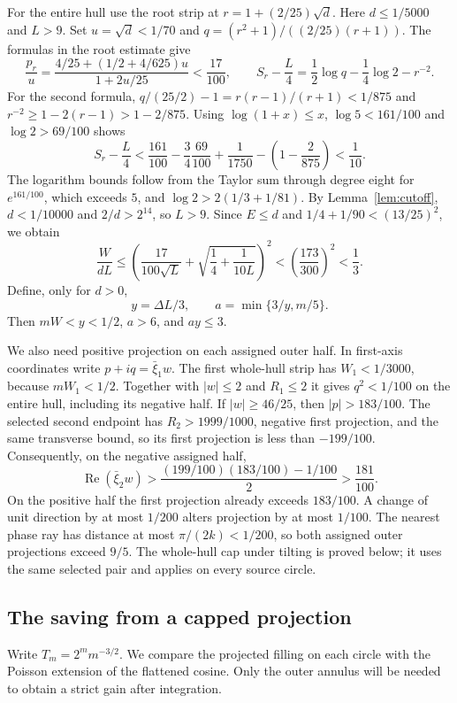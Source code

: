 \documentclass[11pt]{article}
\begin{document}
	For the entire hull use the root strip at $r=1+(2/25)\sqrt d$.
	Here $d\leq1/5000$ and $L>9$. Set $u=\sqrt d<1/70$ and
	$q=(r^2+1)/((2/25)(r+1))$. The formulas in the root estimate give
	\[
	\frac{p_r}{u}
	=\frac{4/25+(1/2+4/625)u}{1+2u/25}<\frac{17}{100},
	\qquad
	S_r-\frac L4=\frac12\log q-\frac14\log2-r^{-2}.
	\]
	For the second formula, $q/(25/2)-1=r(r-1)/(r+1)<1/875$
	and $r^{-2}\geq1-2(r-1)>1-2/875$. Using $\log(1+x)\leq x$,
	$\log5<161/100$ and $\log2>69/100$ shows
	\[
	S_r-\frac L4<
	\frac{161}{100}-\frac34\frac{69}{100}+\frac1{1750}
	-\left(1-\frac2{875}\right)<\frac1{10}.
	\]
	The logarithm bounds follow from the Taylor sum through degree
	eight for $e^{161/100}$, which exceeds $5$, and
	$\log2>2(1/3+1/81)$. By Lemma~\ref{lem:cutoff}, $d<1/10000$ and $2/d>2^{14}$,
	so $L>9$. Since $E\leq d$ and $1/4+1/90<(13/25)^2$, we obtain
	\begin{equation}\label{eq:width-input}
		\frac{W}{dL}\leq
		\left(\frac{17}{100\sqrt L}+\sqrt{\frac14+\frac1{10L}}\right)^2
		<\left(\frac{173}{300}\right)^2<\frac13 .
	\end{equation}
	Define, only for $d>0$,
	\begin{equation}\label{eq:new-a}
		y=\Delta L/3,\qquad a=\min\{3/y,m/5\}.
	\end{equation}
	Then $mW<y<1/2$, $a>6$, and $ay\leq3$.
	
	We also need positive projection on each assigned outer half.
	In first-axis coordinates write $p+iq=\bar\xi_1w$.
	The first whole-hull strip has $W_1<1/3000$, because $mW_1<1/2$.
	Together with $|w|\leq2$ and $R_1\leq2$ it gives $q^2<1/100$
	on the entire hull, including its negative half.
	If $|w|\geq46/25$, then $|p|>183/100$.
	The selected second endpoint has $R_2>1999/1000$, negative first
	projection, and the same transverse bound, so its first projection
	is less than $-199/100$.
	Consequently, on the negative assigned half,
	\[
	\operatorname{Re}(\bar\xi_2w)>
	\frac{(199/100)(183/100)-1/100}{2}>\frac{181}{100}.
	\]
	On the positive half the first projection already exceeds $183/100$.
	A change of unit direction by at most $1/200$ alters projection by
	at most $1/100$.  The nearest phase ray has distance at most
	$\pi/(2k)<1/200$, so both assigned outer projections exceed $9/5$.
	The whole-hull cap under tilting is proved below; it uses the same
	selected pair and applies on every source circle.
	
	\subsection{The saving from a capped projection}
	Write $T_m=2^m m^{-3/2}$. We compare the projected filling on each
	circle with the Poisson extension of the flattened cosine. Only the
	outer annulus will be needed to obtain a strict gain after integration.
	
\end{document}
